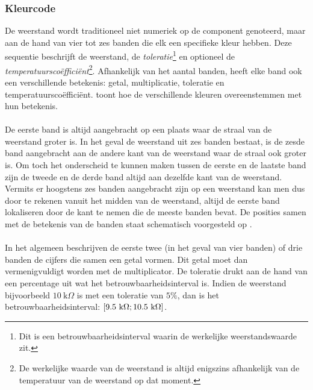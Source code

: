 \subsubsection{Kleurcode}
De weerstand wordt traditioneel niet numeriek op de component genoteerd, maar aan de hand van vier tot zes banden die elk een specifieke kleur hebben. Deze sequentie beschrijft de weerstand, de \emph{toleratie}\footnote{Dit is een betrouwbaarheidsinterval waarin de werkelijke weerstandswaarde zit.} en optioneel de \emph{temperatuursco\"effici\"ent}\footnote{De werkelijke waarde van de weerstand is altijd enigszins afhankelijk van de temperatuur van de weerstand op dat moment.}. Afhankelijk van het aantal banden, heeft elke band ook een verschillende betekenis: getal, multiplicatie, toleratie en temperatuursco\"effici\"ent.  toont hoe de verschillende kleuren overeenstemmen met hun betekenis.

\paragraph{}
De eerste band is altijd aangebracht op een plaats waar de straal van de weerstand groter is. In het geval de weerstand uit zes banden bestaat, is de zesde band aangebracht aan de andere kant van de weerstand waar de straal ook groter is. Om toch het onderscheid te kunnen maken tussen de eerste en de laatste band zijn de tweede en de derde band altijd aan dezelfde kant van de weerstand. Vermits er hoogstens zes banden aangebracht zijn op een weerstand kan men dus door te rekenen vanuit het midden van de weerstand, altijd de eerste band lokaliseren door de kant te nemen die de meeste banden bevat. De posities samen met de betekenis van de banden staat schematisch voorgesteld op .
\paragraph{}
In het algemeen beschrijven de eerste twee (in het geval van vier banden) of drie banden de cijfers die samen een getal vormen. Dit getal moet dan vermenigvuldigt worden met de multiplicator. De toleratie drukt aan de hand van een percentage uit wat het betrouwbaarheidsinterval is. Indien de weerstand bijvoorbeeld $10~\mbox{k}\Omega$ is met een toleratie van $5\%$, dan is het betrouwbaarheidsinterval: $\left[ 9.5~\mbox{k}\Omega ; 10.5~\mbox{k}\Omega \right]$.
